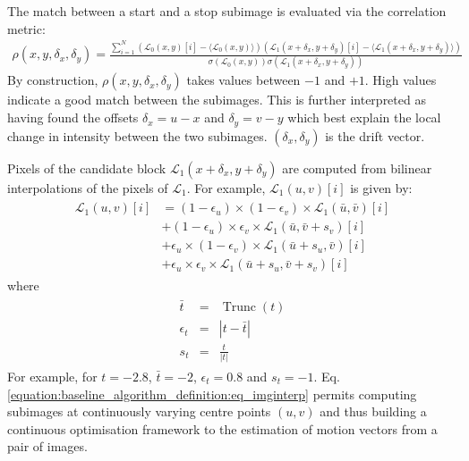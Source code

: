 \documentclass[letterpaper,10pt,english]{jupyterBook}
\begin{document}
\sphinxAtStartPar
The match between a start and a stop sub\sphinxhyphen{}image is evaluated via the correlation metric:
\begin{equation}\label{equation:baseline_algorithm_definition:eq_rho}
\begin{split}
\rho(x,y,\delta_x,\delta_y) =
\frac{
\sum_{i=1}^{N} (\mathcal{L}_0(x,y)[i]-\langle \mathcal{L}_0(x,y) \rangle) (\mathcal{L}_1(x+\delta_x,y+\delta_y)[i]-\langle \mathcal{L}_1(x+\delta_x,y+\delta_y) \rangle)
}{\sigma ( \mathcal{L}_0(x,y) ) \sigma ( \mathcal{L}_1(x+\delta_x,y+\delta_y) )}
\end{split}
\end{equation}
\sphinxAtStartPar
By construction, \(\rho(x,y,\delta_x,\delta_y)\) takes
values between \(-1\) and \(+1\). High values indicate a good match between
the sub\sphinxhyphen{}images. This is further interpreted as having found the offsets
\(\delta_x = u - x\) and \(\delta_y = v - y\) which best explain the local
change in intensity between the two sub\sphinxhyphen{}images. \((\delta_x,\delta_y)\) is
the drift vector.

\sphinxAtStartPar
Pixels of the candidate block \(\mathcal{L}_1(x+\delta_x,y+\delta_y)\) are
computed from bi\sphinxhyphen{}linear interpolations of the pixels of \(\mathcal{L}_1\).
For example, \(\mathcal{L}_1(u,v)[i]\) is given by:
\begin{equation}\label{equation:baseline_algorithm_definition:eq_imginterp}
\begin{split}
\begin{split}
\mathcal{L}_1(u,v)[i] & = (1 - \epsilon_{u}) \times (1 - \epsilon_{v}) \times \mathcal{L}_1(\bar{u},\bar{v})[i] \\
        &+  (1 - \epsilon_{u}) \times \epsilon_{v} \times  \mathcal{L}_1(\bar{u},\bar{v}+s_{v})[i] \\
        &+ \epsilon_{u} \times (1 - \epsilon_{v}) \times  \mathcal{L}_1(\bar{u}+s_{u},\bar{v})[i] \\
        &+ \epsilon_{u} \times \epsilon_{v} \times \mathcal{L}_1(\bar{u}+s_{u},\bar{v}+s_{v})[i]
\end{split}
\end{split}
\end{equation}
\sphinxAtStartPar
where
\begin{equation*}
\begin{split}
\begin{aligned}
\bar{t} & = & \operatorname{Trunc}(t) \\
\epsilon_t & = & |t - \bar{t}| \\
s_t        & = & \frac{t}{|t|}
\end{aligned}
\end{split}
\end{equation*}
\sphinxAtStartPar
For example, for \(t=-2.8\), \(\bar{t}=-2\), \(\epsilon_t=0.8\) and \(s_t=-1\). Eq. \eqref{equation:baseline_algorithm_definition:eq_imginterp} permits computing 
sub\sphinxhyphen{}images at continuously varying centre points \((u,v)\) and thus building a continuous optimisation framework to the estimation of motion
vectors from a pair of images.
\end{document}
